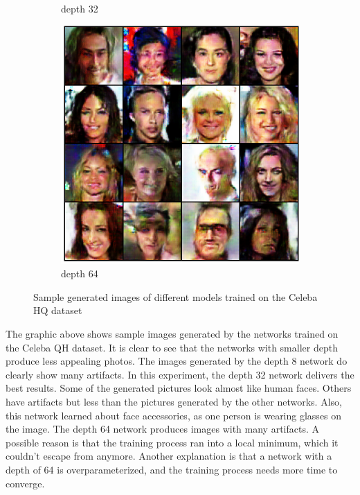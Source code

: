 \begin{figure}[H]
\begin{subfigure}[b]{0.24\textwidth}
        \caption{depth 32}
        \label{fig:celeba_32}
    \end{subfigure}
    \hfill
    \begin{subfigure}[b]{0.24\textwidth}
        \centering
        \includegraphics[width=\textwidth]{resources/images/output_celeba_64.eps}
        \caption{depth 64}
        \label{fig:celeba_64}
    \end{subfigure}
    \caption{Sample generated images of different models trained on the Celeba HQ dataset}
    \label{fig:output_celeba}
\end{figure}

The graphic above shows sample images generated by the networks trained on the Celeba QH dataset. It is clear to see that the networks with smaller depth produce less appealing photos. The images generated by the depth 8 network do clearly show many artifacts. In this experiment, the depth 32 network delivers the best results. Some of the generated pictures look almost like human faces. Others have artifacts but less than the pictures generated by the other networks. Also, this network learned about face accessories, as one person is wearing glasses on the image. The depth 64 network produces images with many artifacts. A possible reason is that the training process ran into a local minimum, which it couldn't escape from anymore. Another explanation is that a network with a depth of 64 is overparameterized, and the training process needs more time to converge.

